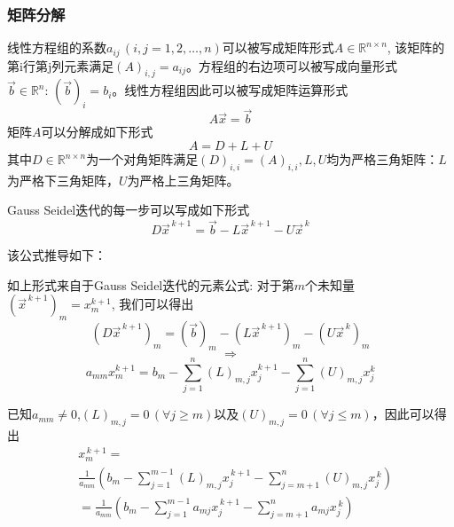 \documentclass[twoside,twocolumn]{article}
\begin{document}
\begin{CJK*}{UTF8}{gkai}
	\subsubsection{矩阵分解}
	线性方程组的系数$a_{ij}\,(i,j=1,2,\ldots ,n)$可以被写成矩阵形式$ A\in \mathbb {R} ^{n\times n}$, 该矩阵的第i行第j列元素满足$(A)_{i,j}=a_{ij}$。方程组的右边项可以被写成向量形式${\vec {b}}\in \mathbb {R} ^{n}:\,({\vec {b}})_{i}=b_{i}$。线性方程组因此可以被写成矩阵运算形式
	\begin{equation*}
	A{\vec {x}}={\vec {b}}
	\end{equation*}
	矩阵$A$可以分解成如下形式
	\begin{equation*}
	A=D+L+U
	\end{equation*}
	其中$D\in \mathbb {R} ^{n\times n}$为一个对角矩阵满足$(D)_{i,i}=(A)_{i,i},L,U$均为严格三角矩阵：$L$为严格下三角矩阵，$U$为严格上三角矩阵。
	
	Gauss Seidel迭代的每一步可以写成如下形式
	\begin{equation*}
	D{\vec {x}}^{\,k+1}={\vec {b}}-L{\vec {x}}^{\,k+1}-U{\vec {x}}^{\,k}
	\end{equation*}
	
	该公式推导如下：
	
	如上形式来自于Gauss Seidel迭代的元素公式: 对于第$m$个未知量$({\vec {x}}^{\,k+1})_{m}=x_{m}^{k+1}$, 我们可以得出
	\begin{equation*}
	(D{\vec {x}}^{\,k+1})_{m}=({\vec {b}})_{m}-(L{\vec {x}}^{\,k+1})_{m}-(U{\vec {x}}^{\,k})_{m}
	\end{equation*}
	\begin{equation*}
	\Rightarrow
	\end{equation*}
	\begin{equation*}
	a_{mm}x_{m}^{k+1}=b_{m}-\sum _{j=1}^{n}(L)_{m,j}x_{j}^{k+1}-\sum _{j=1}^{n}(U)_{m,j}x_{j}^{k}
	\end{equation*}
	
	已知$a_{mm}\neq 0$,$(L)_{m,j}=0\,(\forall j\geq m)$以及$(U)_{m,j}=0\,(\forall j\leq m)$，因此可以得出
	\begin{equation*}
	\begin{aligned}
	&x_{m}^{\,k+1}=\\&{\frac {1}{a_{mm}}}\left(b_{m}-\sum _{j=1}^{m-1}(L)_{m,j}x_{j}^{\,k+1}-\sum _{j=m+1}^{n}(U)_{m,j}x_{j}^{\,k}\right)\\
	&={\frac {1}{a_{mm}}}\left(b_{m}-\sum _{j=1}^{m-1}a_{mj}x_{j}^{\,k+1}-\sum _{j=m+1}^{n}a_{mj}x_{j}^{\,k}\right)
	\end{aligned}
	\end{equation*}

\end{CJK*}
\end{document}
